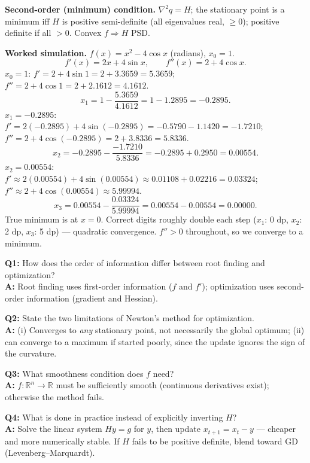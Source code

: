 \textbf{Second-order (minimum) condition.} $\nabla^2 q = H$; the stationary point is a minimum iff $H$ is positive semi-definite (all eigenvalues real, $\ge0$); positive definite if all $>0$. Convex $f \Rightarrow H$ PSD.

\begin{examplebox}
\textbf{Worked simulation.} $f(x)=x^2-4\cos x$ (radians), $x_0=1$.
\[
f'(x)=2x+4\sin x, \qquad f''(x)=2+4\cos x.
\]
$x_0=1$: $f'=2+4\sin1 = 2+3.3659=5.3659$; $f''=2+4\cos1=2+2.1612=4.1612$.
\[
x_1 = 1-\frac{5.3659}{4.1612}=1-1.2895=-0.2895.
\]
$x_1=-0.2895$: $f'=2(-0.2895)+4\sin(-0.2895)=-0.5790-1.1420=-1.7210$; $f''=2+4\cos(-0.2895)=2+3.8336=5.8336$.
\[
x_2 = -0.2895-\frac{-1.7210}{5.8336}=-0.2895+0.2950=0.00554.
\]
$x_2=0.00554$: $f'\approx2(0.00554)+4\sin(0.00554)\approx0.01108+0.02216=0.03324$; $f''\approx2+4\cos(0.00554)\approx5.99994$.
\[
x_3 = 0.00554-\frac{0.03324}{5.99994}=0.00554-0.00554=0.00000.
\]
True minimum is at $x=0$. Correct digits roughly double each step ($x_1$: 0 dp, $x_2$: 2 dp, $x_3$: 5 dp) — quadratic convergence. $f''>0$ throughout, so we converge to a minimum.
\end{examplebox}

\begin{qabox}
\textbf{Q1:} How does the order of information differ between root finding and optimization? \\
\textbf{A:} Root finding uses first-order information ($f$ and $f'$); optimization uses second-order information (gradient and Hessian).

\textbf{Q2:} State the two limitations of Newton's method for optimization. \\
\textbf{A:} (i) Converges to \emph{any} stationary point, not necessarily the global optimum; (ii) can converge to a maximum if started poorly, since the update ignores the sign of the curvature.

\textbf{Q3:} What smoothness condition does $f$ need? \\
\textbf{A:} $f:\mathbb R^n\to\mathbb R$ must be sufficiently smooth (continuous derivatives exist); otherwise the method fails.

\textbf{Q4:} What is done in practice instead of explicitly inverting $H$? \\
\textbf{A:} Solve the linear system $Hy=g$ for $y$, then update $x_{t+1}=x_t-y$ — cheaper and more numerically stable. If $H$ fails to be positive definite, blend toward GD (Levenberg--Marquardt).
\end{qabox}

